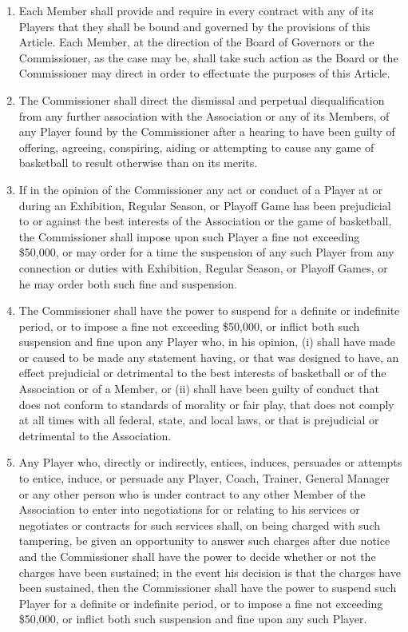 \documentclass[]{book}
\providecommand{\tightlist}{%
  \setlength{\itemsep}{0pt}\setlength{\parskip}{0pt}}
\begin{document}
\begin{enumerate}
\def\labelenumi{(\alph{enumi})}
\tightlist
\item
  Each Member shall provide and require in every contract with any of its Players that they shall be bound and governed by the provisions of this Article. Each Member, at the direction of the Board of Governors or the Commissioner, as the case may be, shall take such action as the Board or the Commissioner may direct in order to effectuate the purposes of this Article.
\item
  The Commissioner shall direct the dismissal and perpetual disqualification from any further association with the Association or any of its Members, of any Player found by the Commissioner after a hearing to have been guilty of offering, agreeing, conspiring, aiding or attempting to cause any game of basketball to result otherwise than on its merits.
\item
  If in the opinion of the Commissioner any act or conduct of a Player at or during an Exhibition, Regular Season, or Playoff Game has been prejudicial to or against the best interests of the Association or the game of basketball, the Commissioner shall impose upon such Player a fine not exceeding \$50,000, or may order for a time the suspension of any such Player from any connection or duties with Exhibition, Regular Season, or Playoff Games, or he may order both such fine and suspension.
\item
  The Commissioner shall have the power to suspend for a definite or indefinite period, or to impose a fine not exceeding \$50,000, or inflict both such suspension and fine upon any Player who, in his opinion, (i) shall have made or caused to be made any statement having, or that was designed to have, an effect prejudicial or detrimental to the best interests of basketball or of the Association or of a Member, or (ii) shall have been guilty of conduct that does not conform to standards of morality or fair play, that does not comply at all times with all federal, state, and local laws, or that is prejudicial or detrimental to the Association.
\item
  Any Player who, directly or indirectly, entices, induces, persuades or attempts to entice, induce, or persuade any Player, Coach, Trainer, General Manager or any other person who is under contract to any other Member of the Association to enter into negotiations for or relating to his services or negotiates or contracts for such services shall, on being charged with such tampering, be given an opportunity to answer such charges after due notice and the Commissioner shall have the power to decide whether or not the charges have been sustained; in the event his decision is that the charges have been sustained, then the Commissioner shall have the power to suspend such Player for a definite or indefinite period, or to impose a fine not exceeding \$50,000, or inflict both such suspension and fine upon any such Player.

\end{enumerate}
\end{document}
